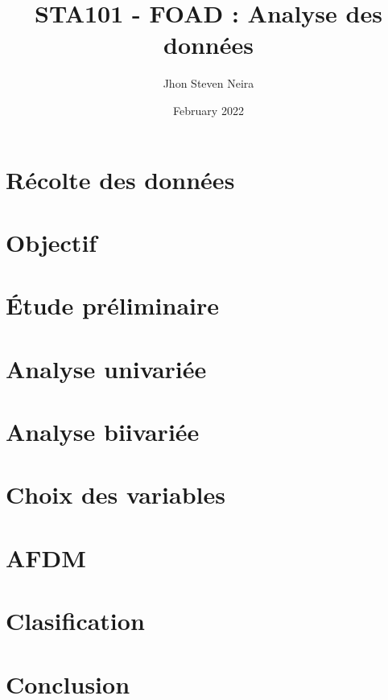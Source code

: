 \documentclass[12pt, a4paper]{article}
\title{STA101 - FOAD : Analyse des données}
\author{Jhon Steven Neira}
\date{February 2022}
\begin{document}
  
\maketitle
  
\tableofcontents

\section{Récolte des  données }


\section{Objectif}



\section{Étude préliminaire}



\section{Analyse univariée}



\section{Analyse biivariée}


\section{Choix des variables}


\section{AFDM }


\section{Clasification }


\section{Conclusion }


         
\end{document}
